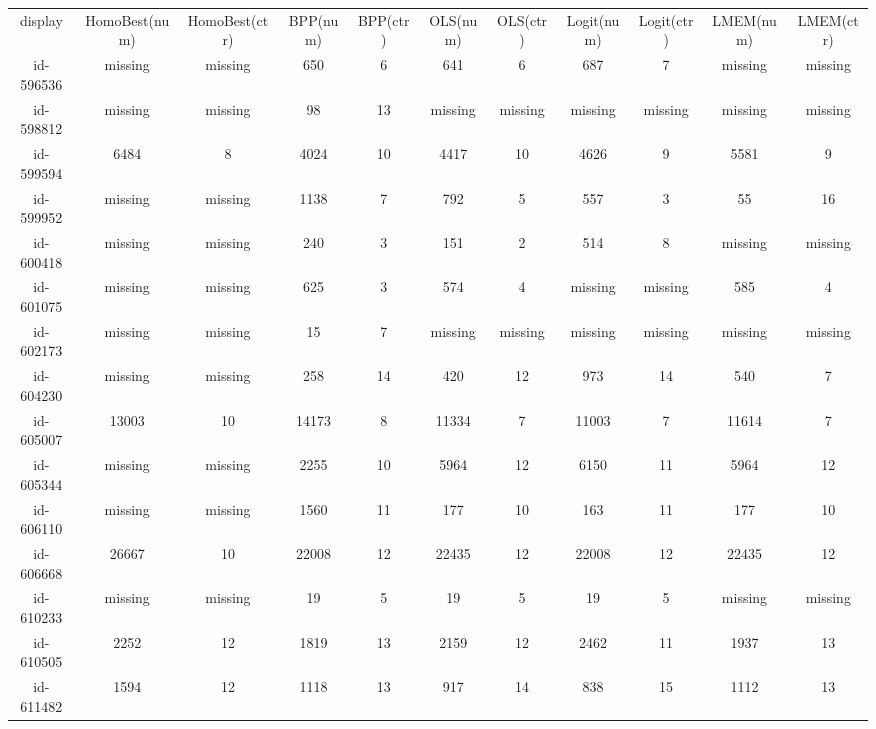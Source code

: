 \begin{tabular}{ccccccccccc}
display & HomoBest(num) & HomoBest(ctr) & BPP(num) & BPP(ctr) & OLS(num) & OLS(ctr) & Logit(num) & Logit(ctr) & LMEM(num) & LMEM(ctr)\\
id-596536 & missing & missing & 650 & 6 & 641 & 6 & 687 & 7 & missing & missing\\
id-598812 & missing & missing & 98 & 13 & missing & missing & missing & missing & missing & missing\\
id-599594 & 6484 & 8 & 4024 & 10 & 4417 & 10 & 4626 & 9 & 5581 & 9\\
id-599952 & missing & missing & 1138 & 7 & 792 & 5 & 557 & 3 & 55 & 16\\
id-600418 & missing & missing & 240 & 3 & 151 & 2 & 514 & 8 & missing & missing\\
id-601075 & missing & missing & 625 & 3 & 574 & 4 & missing & missing & 585 & 4\\
id-602173 & missing & missing & 15 & 7 & missing & missing & missing & missing & missing & missing\\
id-604230 & missing & missing & 258 & 14 & 420 & 12 & 973 & 14 & 540 & 7\\
id-605007 & 13003 & 10 & 14173 & 8 & 11334 & 7 & 11003 & 7 & 11614 & 7\\
id-605344 & missing & missing & 2255 & 10 & 5964 & 12 & 6150 & 11 & 5964 & 12\\
id-606110 & missing & missing & 1560 & 11 & 177 & 10 & 163 & 11 & 177 & 10\\
id-606668 & 26667 & 10 & 22008 & 12 & 22435 & 12 & 22008 & 12 & 22435 & 12\\
id-610233 & missing & missing & 19 & 5 & 19 & 5 & 19 & 5 & missing & missing\\
id-610505 & 2252 & 12 & 1819 & 13 & 2159 & 12 & 2462 & 11 & 1937 & 13\\
id-611482 & 1594 & 12 & 1118 & 13 & 917 & 14 & 838 & 15 & 1112 & 13\\
\end{tabular}
